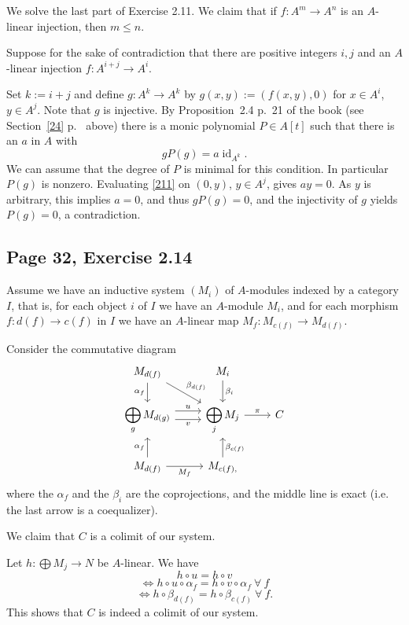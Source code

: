 \documentclass[parskip=half,fontsize=12pt]{scrartcl}%
\newcommand{\oo}{\operatorname}\newcommand{\ooo}{\operatorname*}
\newcommand{\ds}{\displaystyle}
\begin{document}
We solve the last part of Exercise 2.11. We claim that if $f:A^m\to A^n$ is an $A$-linear injection, then $m\le n$. 

Suppose for the sake of contradiction that there are positive integers $i,j$ and an $A$-linear injection $f:A^{i+j}\to A^i$. 

Set $k:=i+j$ and define $g:A^k\to A^k$ by $g(x,y):=(f(x,y),0)$ for $x\in A^i$, $y\in A^j$. Note that $g$ is injective. By Proposition~2.4 p.~21 of the book (see Section~\ref{24} p.~\pageref{24} above) there is a monic polynomial $P\in A[t]$ such that there is an $a$ in $A$ with 
\begin{equation}\label{211}
gP(g)=a\oo{id}_{A^k}.
\end{equation} 
We can assume that the degree of $P$ is minimal for this condition. In particular $P(g)$ is nonzero. Evaluating \eqref{211} on $(0,y)$, $y\in A^j$, gives $ay=0$. As $y$ is arbitrary, this implies $a=0$, and thus $gP(g)=0$, and the injectivity of $g$ yields $P(g)=0$, a contradiction. 

\subsection{Page 32, Exercise 2.14}\label{colim}%

Assume we have an inductive system $(M_i)$ of $A$-modules indexed by a category  $I$, that is, for each object $i$ of $I$ we have an $A$-module $M_i$, and for each morphism $f:d(f)\to c(f)$ in $I$ we have an $A$-linear map $M_f:M_{c(f)}\to M_{d(f)}$. 

Consider the commutative diagram %
$$
\begin{tikzcd}
M_{d(f)}\ar[d,"\alpha_{f}"']\ar[dr,"\beta_{d(f)}"]&M_i\ar[d,"\beta_i"]\\ 
\ds\bigoplus_gM_{d(g)}\ar[r,yshift=0.9ex,"u"]\ar[r,yshift=-0.9ex,"v"']&\ds\bigoplus_jM_j\ar[r,"\pi"]&C\\ 
M_{d(f)}\ar[u,"\alpha_{f}"]\ar[r,"M_f"']&M_{c(f),}\ar[u,"\beta_{c(f)}"']
\end{tikzcd}
$$ 
where the $\alpha_f$ and the $\beta_i$ are the coprojections, and the middle line is exact (i.e. the last arrow is a coequalizer). 

We claim that $C$ is a colimit of our system. %

Let $h:\bigoplus M_j\to N$ be $A$-linear. We have 
$$
h\circ u=h\circ v
$$ 
$$
\iff h\circ u\circ\alpha_f=h\circ v\circ\alpha_f\ \forall\ f
$$ 
$$
\iff h\circ\beta_{d(f)}=h\circ\beta_{c(f)}\ \forall\ f.
$$ 
This shows that $C$ is indeed a colimit of our system.
\end{document}
